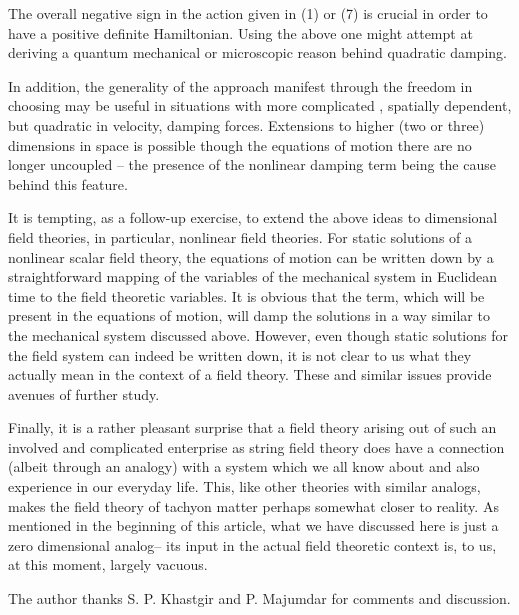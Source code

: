 \documentclass[a4paper,prd,aps,twocolumn]{revtex4}
\begin{document}
{The overall negative sign in the action given in 
(1) or (7) is crucial in order to
have a positive definite Hamiltonian.
Using the above one might attempt at deriving a quantum mechanical
or microscopic reason behind  quadratic damping. 
 
In addition, the generality of the approach manifest through the
freedom in choosing \coordHE{} may be useful in situations with more complicated
, spatially dependent, but quadratic in velocity, damping forces. Extensions to
higher (two or three) dimensions in space is possible though
the equations of motion there are no longer uncoupled -- the presence
of the nonlinear damping term being the cause behind this
feature.

It is tempting, as a follow-up exercise, to extend the above ideas to \coordHE{}
dimensional field theories, in particular, nonlinear field theories.
For static solutions of a nonlinear scalar field theory, the 
equations of motion can be written down by a straightforward mapping
of the variables of the mechanical system in Euclidean time to the 
field theoretic variables.
It is obvious that the 
\coordHE{} term, which will be present in the equations of motion,
will damp the solutions in a way similar to the mechanical system
discussed above. However, even though static solutions for the field system
can indeed be written down, it is not clear to us what they actually mean
in the context of a field theory. 
These and similar issues provide avenues of further study.

Finally, it is a rather pleasant surprise that a field theory arising out
of such an involved and complicated enterprise as string field theory
does have a connection (albeit through an analogy) with a system which
we all know about and also experience in our everyday life. This, like
other theories with similar analogs, makes the field theory of tachyon matter
perhaps somewhat closer to reality. As mentioned in the beginning of this
article, what we have discussed here is just a zero dimensional analog--
its input in the actual field theoretic context is, to us, at this moment,
largely vacuous.   

The author thanks S. P. Khastgir and P. Majumdar for comments and discussion.
 
}
\end{document}
